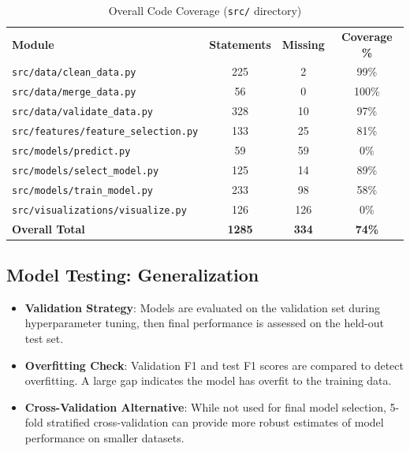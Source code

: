 \documentclass[12pt, a4paper]{article}
\begin{document}
\begin{table}[ht]
\centering
\caption{Overall Code Coverage (\texttt{src/} directory)}
\label{tab:code_coverage}
\renewcommand{\arraystretch}{1.2}
\begin{tabular}{l c c c}
\rowcolor{slate}
{\color{white}\small\bfseries Module} &
{\color{white}\small\bfseries Statements} &
{\color{white}\small\bfseries Missing} &
{\color{white}\small\bfseries Coverage \%} \\
\rowcolor{lightgray}
\texttt{src/data/clean\_data.py} & 225 & 2 & 99\% \\
\rowcolor{white}
\texttt{src/data/merge\_data.py} & 56 & 0 & 100\% \\
\rowcolor{lightgray}
\texttt{src/data/validate\_data.py} & 328 & 10 & 97\% \\
\rowcolor{white}
\texttt{src/features/feature\_selection.py} & 133 & 25 & 81\% \\
\rowcolor{lightgray}
\texttt{src/models/predict.py} & 59 & 59 & 0\% \\
\rowcolor{white}
\texttt{src/models/select\_model.py} & 125 & 14 & 89\% \\
\rowcolor{lightgray}
\texttt{src/models/train\_model.py} & 233 & 98 & 58\% \\
\rowcolor{white}
\texttt{src/visualizations/visualize.py} & 126 & 126 & 0\% \\
\hline
\textbf{Overall Total} & \textbf{1285} & \textbf{334} & \textbf{74\%} \\
\end{tabular}
\end{table}

\subsection{Model Testing: Generalization}
\begin{itemize}
    \item \textbf{Validation Strategy}: Models are evaluated on the validation set during hyperparameter tuning, then final performance is assessed on the held-out test set.
    \item \textbf{Overfitting Check}: Validation F1 and test F1 scores are compared to detect overfitting. A large gap indicates the model has overfit to the training data.
    \item \textbf{Cross-Validation Alternative}: While not used for final model selection, 5-fold stratified cross-validation can provide more robust estimates of model performance on smaller datasets.
\end{itemize}
\end{document}
